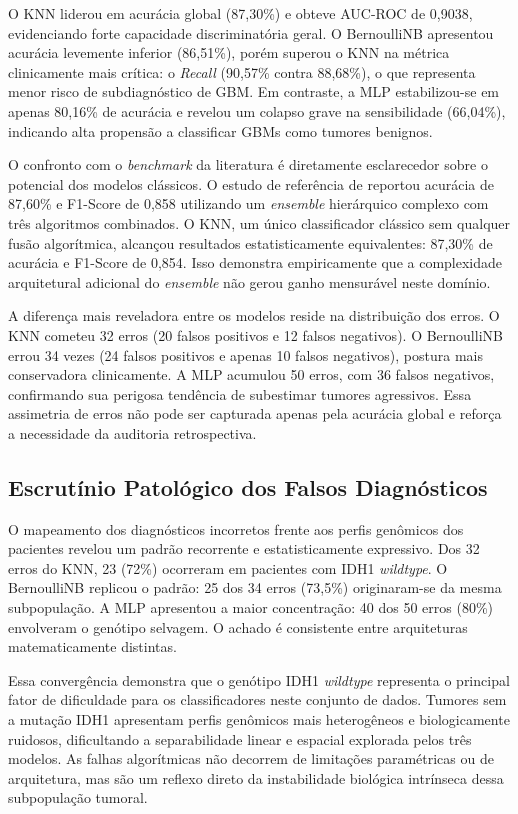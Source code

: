 \documentclass[12pt]{article}
\begin{document}
O KNN liderou em acurácia global (87,30\%) e obteve AUC-ROC de 0,9038, evidenciando forte capacidade discriminatória geral. O BernoulliNB apresentou acurácia levemente inferior (86,51\%), porém superou o KNN na métrica clinicamente mais crítica: o \textit{Recall} (90,57\% contra 88,68\%), o que representa menor risco de subdiagnóstico de GBM. Em contraste, a MLP estabilizou-se em apenas 80,16\% de acurácia e revelou um colapso grave na sensibilidade (66,04\%), indicando alta propensão a classificar GBMs como tumores benignos.

O confronto com o \textit{benchmark} da literatura é diretamente esclarecedor sobre o potencial dos modelos clássicos. O estudo de referência de \cite{tasci2022} reportou acurácia de 87,60\% e F1-Score de 0,858 utilizando um \textit{ensemble} hierárquico complexo com três algoritmos combinados. O KNN, um único classificador clássico sem qualquer fusão algorítmica, alcançou resultados estatisticamente equivalentes: 87,30\% de acurácia e F1-Score de 0,854. Isso demonstra empiricamente que a complexidade arquitetural adicional do \textit{ensemble} não gerou ganho mensurável neste domínio.

A diferença mais reveladora entre os modelos reside na distribuição dos erros. O KNN cometeu 32 erros (20 falsos positivos e 12 falsos negativos). O BernoulliNB errou 34 vezes (24 falsos positivos e apenas 10 falsos negativos), postura mais conservadora clinicamente. A MLP acumulou 50 erros, com 36 falsos negativos, confirmando sua perigosa tendência de subestimar tumores agressivos. Essa assimetria de erros não pode ser capturada apenas pela acurácia global e reforça a necessidade da auditoria retrospectiva.

\subsection{Escrutínio Patológico dos Falsos Diagnósticos}
O mapeamento dos diagnósticos incorretos frente aos perfis genômicos dos pacientes revelou um padrão recorrente e estatisticamente expressivo. Dos 32 erros do KNN, 23 (72\%) ocorreram em pacientes com IDH1 \textit{wildtype}. O BernoulliNB replicou o padrão: 25 dos 34 erros (73,5\%) originaram-se da mesma subpopulação. A MLP apresentou a maior concentração: 40 dos 50 erros (80\%) envolveram o genótipo selvagem. O achado é consistente entre arquiteturas matematicamente distintas.

Essa convergência demonstra que o genótipo IDH1 \textit{wildtype} representa o principal fator de dificuldade para os classificadores neste conjunto de dados. Tumores sem a mutação IDH1 apresentam perfis genômicos mais heterogêneos e biologicamente ruidosos, dificultando a separabilidade linear e espacial explorada pelos três modelos. As falhas algorítmicas não decorrem de limitações paramétricas ou de arquitetura, mas são um reflexo direto da instabilidade biológica intrínseca dessa subpopulação tumoral.
\end{document}
